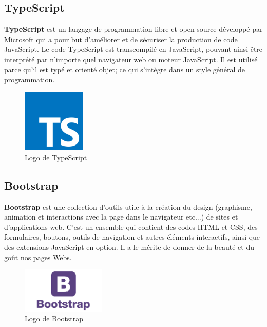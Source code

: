 \documentclass[12pt]{report}
\begin{document}
	  \subsection{TypeScript}
	    \textbf{TypeScript} est un langage de programmation libre et open source développé par Microsoft qui a pour but d'améliorer et de sécuriser la production de code JavaScript. Le code TypeScript est transcompilé en JavaScript, pouvant ainsi être interprété par n'importe quel navigateur web ou moteur JavaScript. Il est utilisé parce qu'il est typé et orienté objet; ce qui s'intègre dans un style général de programmation.
	    
	     \begin{figure}[H]
	      \begin{center}
		\includegraphics[scale=0.6, width=3cm]{images/logoTypeScript.png}
		\caption{Logo de TypeScript}
	      \end{center}
	    \end{figure}
	    
	  \subsection{Bootstrap}
	    \textbf{Bootstrap} est une collection d'outils utile à la création du design (graphisme, animation et interactions avec la page dans le navigateur etc...) de sites et d'applications web. C'est un ensemble qui contient des codes HTML et CSS, des formulaires, boutons, outils de navigation et autres éléments interactifs, ainsi que des extensions JavaScript en option. Il a le mérite de donner de la beauté et du goût nos pages Webs.
	    
	    \begin{figure}[H]
	      \begin{center}
		\includegraphics[scale=0.6, width=4cm]{images/logoBootstrap.png}
		\caption{Logo de Bootstrap}
	      \end{center}
	    \end{figure}
	  
\end{document}
